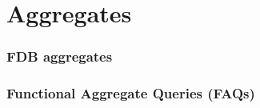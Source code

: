 \chapter{Aggregates}

\subsection{FDB aggregates}

\subsection{Functional Aggregate Queries (FAQs)}


